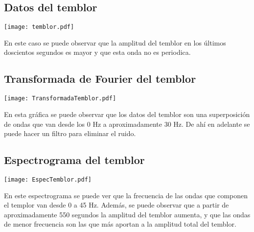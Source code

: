 \documentclass[11pt,letterpaper]{exam}
\begin{document}
\subsection{Datos del temblor}
\begin{center}
\texttt{[image: temblor.pdf]}
\end{center}
En este caso se puede observar que la amplitud del temblor en los últimos doscientos segundos es mayor y que esta onda no es periodica.
\subsection{Transformada de Fourier del temblor}
\begin{center}
\texttt{[image: TransformadaTemblor.pdf]}
\end{center}
En esta gráfica se puede observar que los datos del temblor son una superposición de ondas que van desde los 0 Hz a aproximadamente 30 Hz. De ahí en adelante se puede hacer un filtro para eliminar el ruido.
\subsection{Espectrograma del temblor}
\begin{center}
\texttt{[image: EspecTemblor.pdf]}
\end{center}
En este espectrograma se puede ver que la frecuencia de las ondas que componen el templor van desde 0 a 45 Hz. Además,  se puede observar que a partir de aproximadamente 550 segundos la amplitud del temblor aumenta, y que las ondas de menor frecuencia son las que más aportan a la amplitud total del temblor.
\end{document}
